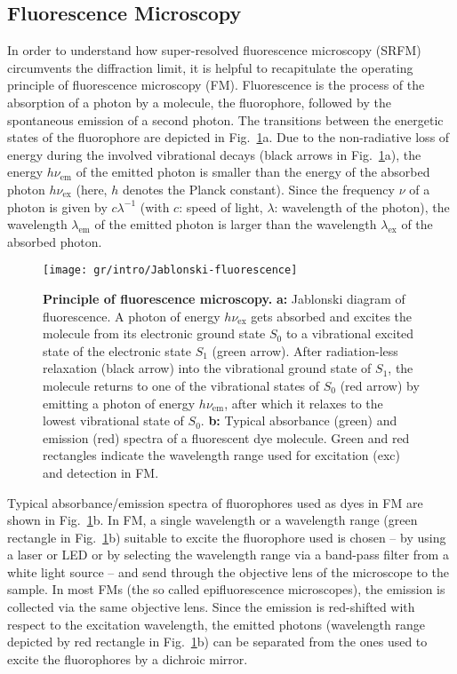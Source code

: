 
\subsection{Fluorescence Microscopy}
\label{sec:fm}
In order to understand how super-resolved fluorescence microscopy (SRFM)
circumvents the diffraction limit, it is helpful to recapitulate the operating
principle of fluorescence microscopy (FM). Fluorescence is the process of the
absorption of a photon by a molecule, the fluorophore, followed by the
spontaneous emission of a second photon. The transitions between the energetic
states of the fluorophore are depicted in
Fig.~\ref{fig:jablonski-fluorescence}a. Due to the non-radiative loss of
energy during the involved vibrational decays (black arrows in
Fig.~\ref{fig:jablonski-fluorescence}a), the energy $h\nu_\text{em}$ of the
emitted photon is smaller than the energy of the absorbed photon
$h\nu_\text{ex}$ (here, $h$ denotes the Planck constant). Since the frequency $\nu$
of a photon is given by $c\lambda^{-1}$ (with $c$: speed of light, $\lambda$:
wavelength of the photon), the wavelength $\lambda_\text{em}$ of the emitted
photon is larger than the wavelength $\lambda_\text{ex}$ of the absorbed
photon.      

\begin{figure}
  \centering
  \texttt{[image: gr/intro/Jablonski-fluorescence]}
  
  \caption{%
    \textbf{Principle of fluorescence microscopy.}  \textbf{a:} Jablonski
    diagram of fluorescence. A photon of energy $h\nu_\text{ex}$ gets absorbed
    and excites the molecule from its electronic ground state $S_0$ to a
    vibrational excited state of the electronic state $S_1$ (green
    arrow). After radiation-less relaxation (black arrow) into the vibrational
    ground state of $S_1$, the molecule returns to one of the vibrational
    states of $S_0$ (red arrow) by emitting a photon of energy
    $h\nu_\text{em}$, after which it relaxes to the lowest vibrational state
    of $S_0$.  \textbf{b:} Typical absorbance (green) and emission (red)
    spectra of a fluorescent dye molecule. Green and red rectangles indicate
    the wavelength range used for excitation (exc) and detection in FM.  }
  \label{fig:jablonski-fluorescence}
\end{figure}

Typical absorbance/emission spectra of fluorophores used as dyes in FM are
shown in Fig.~\ref{fig:jablonski-fluorescence}b. In FM, a single wavelength or
a wavelength range (green rectangle in Fig.~\ref{fig:jablonski-fluorescence}b) 
suitable to excite the fluorophore used is chosen -- by using a laser
or LED or by selecting the wavelength range via a band-pass filter from a
white light source -- and send through the objective lens of the microscope to
the sample. In most FMs (the so called epifluorescence microscopes), the
emission is collected via the same objective lens. Since the emission is
red-shifted with respect to the excitation wavelength, the emitted photons
(wavelength range depicted by red rectangle in
Fig.~\ref{fig:jablonski-fluorescence}b) can be separated from the ones used to
excite the fluorophores by a dichroic mirror.

